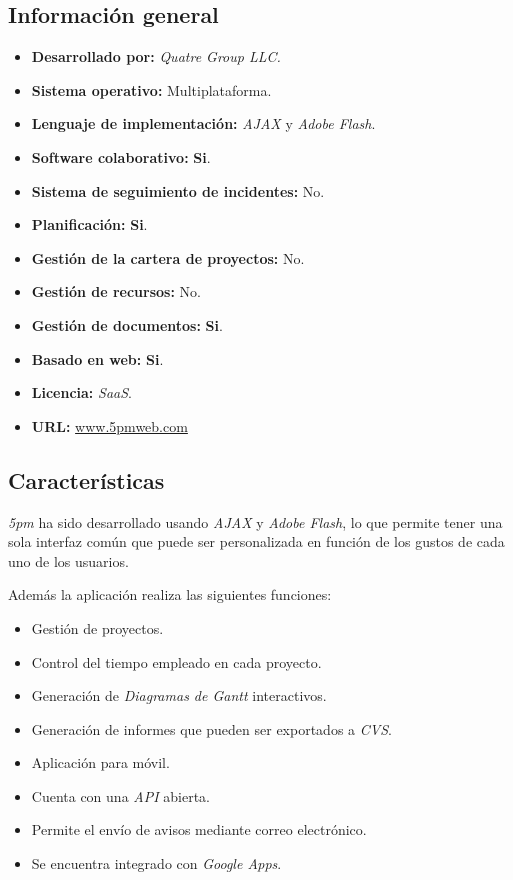 \documentclass[11pt,a4paper,spanish,twoside]{report}
\begin{document}
  \subsection{Información general}
    \begin{itemize}
        \item\textbf{Desarrollado por:} \emph{Quatre Group LLC.}
	\item\textbf{Sistema operativo:} Multiplataforma. 
	\item\textbf{Lenguaje de implementación:} \emph{AJAX} y \emph{Adobe Flash}.
        \item\textbf{Software colaborativo:} \textbf{Si}. 
        \item\textbf{Sistema de seguimiento de incidentes:} No. 
	\item\textbf{Planificación:} \textbf{Si}.
	\item\textbf{Gestión de la cartera de proyectos:} No.
	\item\textbf{Gestión de recursos:} No.
	\item\textbf{Gestión de documentos:} \textbf{Si}.
        \item\textbf{Basado en web:} \textbf{Si}.
	\item\textbf{Licencia:} \emph{SaaS}.
	\item\textbf{URL:} \url{www.5pmweb.com}
        \end{itemize}

	\subsection{Características}
        
        \emph{5pm} ha sido desarrollado usando \emph{AJAX} y \emph{Adobe
          Flash}, lo que permite tener una sola interfaz común que puede ser
        personalizada en función de los gustos de cada uno de los usuarios.

        Además la aplicación realiza las siguientes funciones:
        \begin{itemize}
          \item Gestión de proyectos.
          \item Control del tiempo empleado en cada proyecto.
          \item Generación de \emph {Diagramas de Gantt} interactivos.
          \item Generación de informes que pueden ser exportados a
            \emph{CVS}.
          \item Aplicación para móvil.
          \item Cuenta con una \emph{API} abierta.
          \item Permite el envío de avisos mediante correo electrónico.
          \item Se encuentra integrado con \emph{Google Apps}.
        \end{itemize}
        
\end{document}
